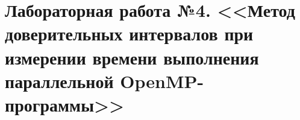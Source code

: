 \section{Лабораторная работа №4. <<Метод доверительных интервалов при измерении времени выполнения параллельной OpenMP-программы>>}
\label{sec:lab4-openmp}





